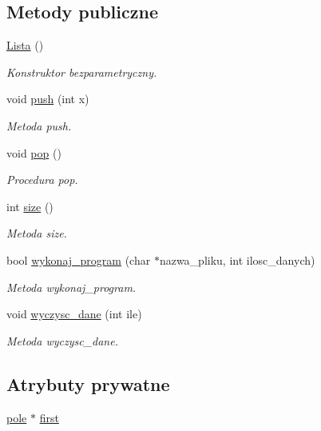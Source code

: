 \subsection*{Metody publiczne}
\begin{DoxyCompactItemize}
\item 
\hyperlink{class_lista_a1f668b36909182ef1360b48503529a31}{Lista} ()
\begin{DoxyCompactList}\small\item\em Konstruktor bezparametryczny. \end{DoxyCompactList}\item 
void \hyperlink{class_lista_ac844f54fca7aaadf53620d1e147068e3}{push} (int x)
\begin{DoxyCompactList}\small\item\em Metoda push. \end{DoxyCompactList}\item 
void \hyperlink{class_lista_a5bece8ad206f5e6497f8cc23419ed051}{pop} ()
\begin{DoxyCompactList}\small\item\em Procedura pop. \end{DoxyCompactList}\item 
int \hyperlink{class_lista_a3836382e3cf53b6ea281937d045d181c}{size} ()
\begin{DoxyCompactList}\small\item\em Metoda size. \end{DoxyCompactList}\item 
bool \hyperlink{class_lista_a39367fb8f22f8bb34ba65bcc37f522bf}{wykonaj\-\_\-program} (char $\ast$nazwa\-\_\-pliku, int ilosc\-\_\-danych)
\begin{DoxyCompactList}\small\item\em Metoda wykonaj\-\_\-program. \end{DoxyCompactList}\item 
void \hyperlink{class_lista_af73c0c1eba31c0d82d107d57e99fc3d7}{wyczysc\-\_\-dane} (int ile)
\begin{DoxyCompactList}\small\item\em Metoda wyczysc\-\_\-dane. \end{DoxyCompactList}\end{DoxyCompactItemize}
\subsection*{Atrybuty prywatne}
\begin{DoxyCompactItemize}
\item 
\hyperlink{structpole}{pole} $\ast$ \hyperlink{class_lista_ae9ddc4b39562b5382a9c2559f2e4b421}{first}
\end{DoxyCompactItemize}
